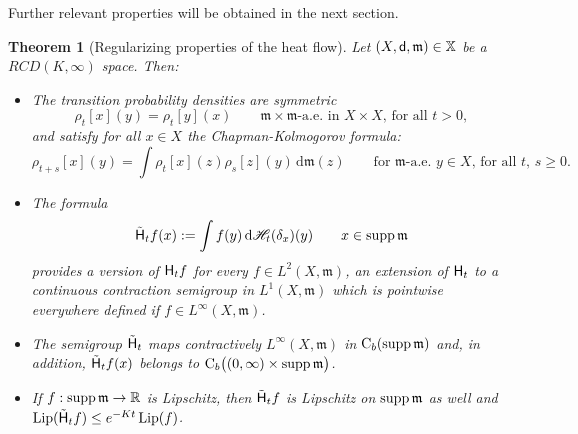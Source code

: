\documentclass[reqno,11pt]{article}
\numberwithin{equation}{section}
\newcommand{\C}{\mathbb{C}}
\newcommand{\R}{\mathbb{R}}
\newcommand{\mm}{{\mbox{\boldmath$m$}}}
\newcommand{\sfd}{{\sf d}}
\newcommand{\supp}{\mathop{\rm supp}\nolimits}   %
\newcommand{\Lip}{\mathop{\rm Lip}\nolimits}          %
\renewcommand{\d}{{\mathrm d}}
\newtheorem{theorem}{Theorem}[section]
\newcommand{\X}{\mathbb X}
\renewcommand{\C}{{\rm Ch}}
\newcommand{\rcd}[2]{RCD(#1,#2)}
\newcommand{\heatl}{{\sf H}}
\newcommand{\heatw}{{\mathscr H}}
\newcommand{\ke}[2]{\heatw_{#2}(\delta_{#1})}
\newcommand{\ked}[2]{\rho_{#2}[#1]}\renewcommand{\C}{{\sf Ch}}
\newcommand{\Cb}{\mathrm C_b}
\renewcommand{\mm}{\mathfrak m}
\begin{document}
Further relevant properties will be obtained in the next section.
\begin{theorem}[Regularizing properties of the heat flow]\label{thm:facili}
Let $(X,\sfd,\mm)\in\X$ be a $\rcd K\infty$ space. Then:
\begin{itemize}
\item[(i)] The transition probability densities are symmetric
\begin{equation}\label{eq:symmetrictp}
\ked xt (y)=\ked yt (x)\qquad\text{$\mm\times\mm$-a.e.~in $X\times
X$, for all $t>0,$}
\end{equation}
and satisfy for all $x\in X$ the Chapman-Kolmogorov formula:
\begin{equation}
\label{eq:chapman} \ked x{t+s}(y)=\int\ked xt (z)\ked zs
(y)\,\d\mm(z)\qquad\text{for $\mm$-a.e.~$y\in X$, for all $t,\,s\geq
0$.}
\end{equation}
\item[(ii)] The formula
\begin{equation}
\label{eq:l1} \tilde\heatl_tf(x):=\int f(y)\,\d\ke xt(y)\qquad
x\in\supp\mm
\end{equation}
provides a version of $\heatl_t f$ for every $f\in L^2(X,\mm)$, an
extension of $\heatl_t$ to a continuous contraction semigroup in
$L^1(X,\mm)$ which is pointwise everywhere defined if $f\in
L^\infty(X,\mm)$.
\item[(iii)] The semigroup $\tilde\heatl_t$ maps contractively $L^\infty(X,\mm)$ in
$\Cb(\supp\mm)$ and, in addition, $\tilde\heatl_tf(x)$ belongs to $
\Cb\bigl((0,\infty)\times\supp\mm\bigr)$.
\item[(iv)] If $f:\supp\mm\to\R$ is Lipschitz, then $\tilde\heatl_tf$ is Lipschitz on $\supp\mm$
as well and $\Lip(\tilde\heatl_tf)\leq e^{-Kt}\Lip(f)$.
\end{itemize}
\end{theorem}
\end{document}
